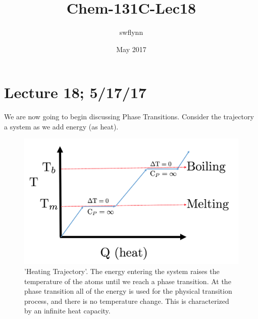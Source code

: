 \documentclass{article}
\title{Chem-131C-Lec18}
\author{swflynn}
\date{May 2017}
\begin{document}
\maketitle

\section*{Lecture 18; 5/17/17}
We are now going to begin discussing Phase Transitions.
Consider the trajectory a system as we add energy (as heat).
\begin{figure}[H]
    \centering
    \includegraphics[width=12cm]{phases.png}
    \caption{'Heating Trajectory'. The energy entering the system raises the temperature of the atoms until we reach a phase transition. At the phase transition all of the energy is used for the physical transition process, and there is no temperature change. This is characterized by an infinite heat capacity. }
    \label{fig:phases}
\end{figure}
\end{document}
